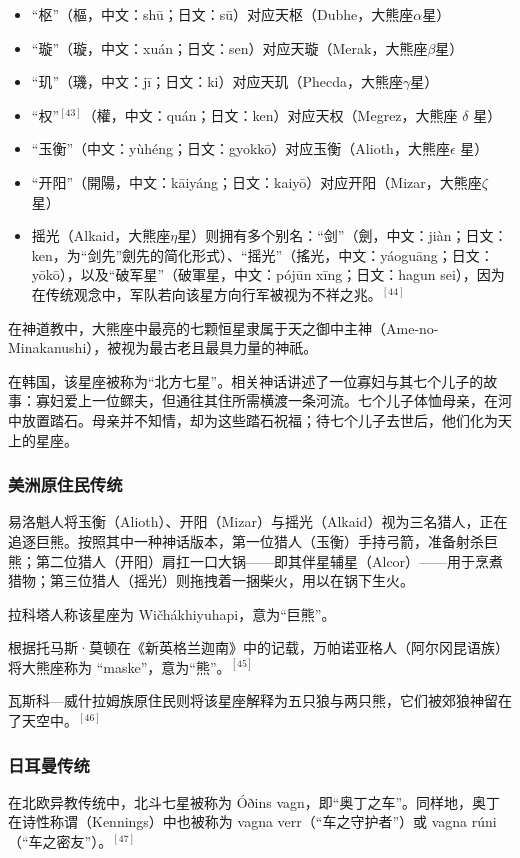 \begin{itemize}
\item “枢”（樞，中文：shū；日文：sū）对应天枢（Dubhe，大熊座$\alpha$星）  
\item “璇”（璇，中文：xuán；日文：sen）对应天璇（Merak，大熊座$\beta$星）  
\item “玑”（璣，中文：jī；日文：ki）对应天玑（Phecda，大熊座$\gamma$星）  
\item “权”$^{[43]}$（權，中文：quán；日文：ken）对应天权（Megrez，大熊座 $\delta$ 星）  
\item “玉衡”（中文：yùhéng；日文：gyokkō）对应玉衡（Alioth，大熊座$\epsilon$ 星）  
\item “开阳”（開陽，中文：kāiyáng；日文：kaiyō）对应开阳（Mizar，大熊座$\zeta$ 星）  
\item 摇光（Alkaid，大熊座$\eta$星）则拥有多个别名：“剑”（劍，中文：jiàn；日文：ken，为“剑先”劍先的简化形式）、“摇光”（搖光，中文：yáoguāng；日文：yōkō），以及“破军星”（破軍星，中文：pójūn xīng；日文：hagun sei），因为在传统观念中，军队若向该星方向行军被视为不祥之兆。$^{[44]}$
\end{itemize}
在神道教中，大熊座中最亮的七颗恒星隶属于天之御中主神（Ame-no-Minakanushi），被视为最古老且最具力量的神祇。

在韩国，该星座被称为“北方七星”。相关神话讲述了一位寡妇与其七个儿子的故事：寡妇爱上一位鳏夫，但通往其住所需横渡一条河流。七个儿子体恤母亲，在河中放置踏石。母亲并不知情，却为这些踏石祝福；待七个儿子去世后，他们化为天上的星座。
\subsubsection{美洲原住民传统}  
易洛魁人将玉衡（Alioth）、开阳（Mizar）与摇光（Alkaid）视为三名猎人，正在追逐巨熊。按照其中一种神话版本，第一位猎人（玉衡）手持弓箭，准备射杀巨熊；第二位猎人（开阳）肩扛一口大锅——即其伴星辅星（Alcor）——用于烹煮猎物；第三位猎人（摇光）则拖拽着一捆柴火，用以在锅下生火。

拉科塔人称该星座为 Wičhákhiyuhapi，意为“巨熊”。

根据托马斯·莫顿在《新英格兰迦南》中的记载，万帕诺亚格人（阿尔冈昆语族）将大熊座称为 “maske”，意为“熊”。$^{[45]}$

瓦斯科—威什拉姆族原住民则将该星座解释为五只狼与两只熊，它们被郊狼神留在了天空中。$^{[46]}$
\subsubsection{日耳曼传统}  
在北欧异教传统中，北斗七星被称为 Óðins vagn，即“奥丁之车”。同样地，奥丁在诗性称谓（Kennings）中也被称为 vagna verr（“车之守护者”）或 vagna rúni（“车之密友”）。$^{[47]}$
